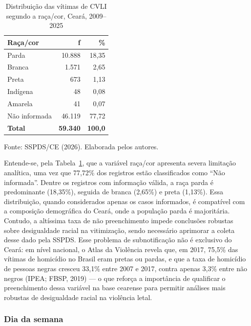 \documentclass[12pt,a4paper]{article}
\newcommand{\fonte}[1]{  \vspace{-2mm}
  \begin{center}\footnotesize Fonte: #1\end{center}
}
\begin{document}
\begin{table}[H]
\centering
\caption{Distribuição das vítimas de CVLI segundo a raça/cor, Ceará, 2009--2025}
\label{tab:raca}
\begin{tabular}{lrr}
\toprule
\textbf{Raça/cor} & \textbf{f} & \textbf{\%} \\
\midrule
Parda          & 10.888 & 18,35 \\
Branca         & 1.571  & 2,65  \\
Preta          & 673    & 1,13  \\
Indígena       & 48     & 0,08  \\
Amarela        & 41     & 0,07  \\
Não informada  & 46.119 & 77,72 \\
\midrule
\textbf{Total} & \textbf{59.340} & \textbf{100,0} \\
\bottomrule
\end{tabular}
\end{table}
\fonte{SSPDS/CE (2026). Elaborada pelos autores.}

Entende-se, pela Tabela~\ref{tab:raca}, que a variável raça/cor apresenta severa limitação analítica, uma vez que 77,72\% dos registros estão classificados como ``Não informada''. Dentre os registros com informação válida, a raça parda é predominante (18,35\%), seguida de branca (2,65\%) e preta (1,13\%). Essa distribuição, quando considerados apenas os casos informados, é compatível com a composição demográfica do Ceará, onde a população parda é majoritária. Contudo, a altíssima taxa de não preenchimento impede conclusões robustas sobre desigualdade racial na vitimização, sendo necessário aprimorar a coleta desse dado pela SSPDS. Esse problema de subnotificação não é exclusivo do Ceará: em nível nacional, o Atlas da Violência revela que, em 2017, 75,5\% das vítimas de homicídio no Brasil eram pretas ou pardas, e que a taxa de homicídio de pessoas negras cresceu 33,1\% entre 2007 e 2017, contra apenas 3,3\% entre não negros (IPEA; FBSP, 2019) --- o que reforça a importância de qualificar o preenchimento dessa variável na base cearense para permitir análises mais robustas de desigualdade racial na violência letal.

\subsubsection{Dia da semana}
\end{document}
